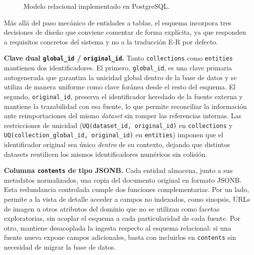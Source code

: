 \begin{figure}[H]
{}
  \caption{Modelo relacional implementado en PostgreSQL.}
  \label{fig:relationalModel}
\end{figure}

Más allá del paso mecánico de entidades a tablas, el esquema incorpora
tres decisiones de diseño que conviene comentar de forma explícita, ya
que responden a requisitos concretos del sistema y no a la traducción
E-R por defecto.

\textbf{Clave dual \texttt{global\_id} / \texttt{original\_id}.}
Tanto \texttt{collections} como \texttt{entities} mantienen dos
identificadores. El primero, \texttt{global\_id}, es una clave primaria
autogenerada que garantiza la unicidad global dentro de la base de
datos y se utiliza de manera uniforme como clave foránea desde el resto
del esquema. El segundo, \texttt{original\_id}, preserva el
identificador heredado de la fuente externa y mantiene la trazabilidad
con esa fuente, lo que permite reconciliar la información ante
reimportaciones del mismo \textit{dataset} sin romper las referencias internas.
Las restricciones de unicidad
(\texttt{UQ(dataset\_id, original\_id)} en \texttt{collections} y
\texttt{UQ(collection\_global\_id, original\_id)} en \texttt{entities})
imponen que el identificador original sea único \emph{dentro} de su
contexto, dejando que distintos datasets reutilicen los mismos
identificadores numéricos sin colisión.

\textbf{Columna \texttt{contents} de tipo JSONB.}
Cada entidad almacena, junto a sus metadatos normalizados, una copia
del documento original en formato JSONB. Esta redundancia controlada
cumple dos funciones complementarias. Por un lado, permite a la vista
de detalle acceder a campos no indexados, como sinopsis, URLs de
imagen u otros atributos del dominio que no se utilizan como facetas
exploratorias, sin acoplar el esquema a cada particularidad de cada
fuente. Por otro, mantiene desacoplada la ingesta respecto al esquema
relacional: si una fuente nueva expone campos adicionales, basta con
incluirlos en \texttt{contents} sin necesidad de migrar la base de
datos.


